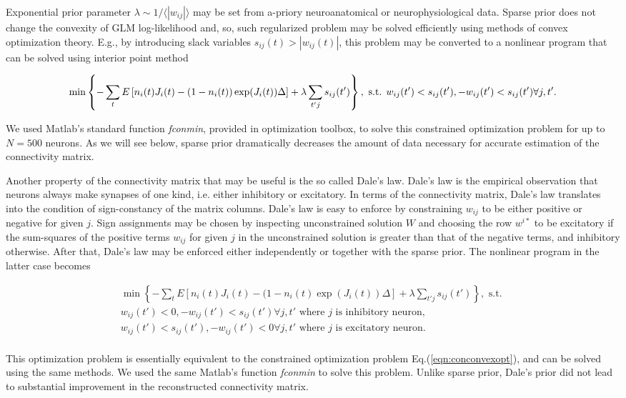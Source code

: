 Exponential prior parameter $\lambda\sim 1/\langle|w_{ij}|\rangle$ may be set from a-priory neuroanatomical or neurophysiological data. Sparse prior does not change the convexity of GLM log-likelihood and, so, such regularized problem may be solved efficiently using methods of convex optimization theory. E.g., by introducing slack variables $s_{ij}(t)>|w_{ij}(t)|$, this problem may be converted to a nonlinear program that can be solved using interior point method

\begin{equation} \label{eqn:conconvexopt}
\min \left\{-\sum\limits_t E\left[ n_i(t) J_i(t) - (1-n_i(t)) \exp(J_i(t)) \Delta \right]+\lambda \sum\limits_{t'j}s_{ij}(t')\right\}, \text{ s.t. } \\
w_{ij}(t')<s_{ij}(t'), -w_{ij}(t')<s_{ij}(t') \forall j, t'.
\end{equation}

We used Matlab's standard function {\em fconmin}, provided in optimization toolbox, to solve this constrained optimization problem for up to $N=500$ neurons. As we will see below, sparse prior dramatically decreases the amount of data necessary for accurate estimation of the connectivity matrix.

Another property of the connectivity matrix that may be useful is the so called Dale's law. Dale's law is the empirical observation that neurons always make synapses of one kind, i.e. either inhibitory or excitatory. In terms of the connectivity matrix, Dale's law translates into the condition of sign-constancy of the matrix columns. Dale's law is easy to enforce by constraining $w_{ij}$ to be either positive or negative for given $j$.  Sign assignments may be chosen by inspecting unconstrained solution $W$ and choosing the row $w^{i*}$ to be excitatory if the sum-squares of the positive terms $w_{ij}$ for given $j$ in the unconstrained solution is greater than that of the negative terms, and inhibitory otherwise.  After that, Dale's law may be enforced either independently or together with the sparse prior.  The nonlinear program in the latter case becomes

\begin{equation}
\begin{array}{l}
\min \left\{-\sum\limits_t E\left[ n_i(t) J_i(t) - (1-n_i(t) \exp(J_i(t)) \Delta \right]+\lambda \sum\limits_{t'j}s_{ij}(t')\right\}, \text{ s.t. }\\
w_{ij}(t')<0, -w_{ij}(t')<s_{ij}(t') \forall j, t'\text{ where }j\text{ is inhibitory neuron}, \\
w_{ij}(t')<s_{ij}(t'), -w_{ij}(t')<0 \forall j, t'\text{ where }j\text{ is excitatory neuron}. \\
\end{array}
\end{equation}

This optimization problem is essentially equivalent to the constrained optimization problem Eq.(\ref{eqn:conconvexopt}), and can be solved using the same methods. We used the same Matlab's function {\em fconmin} to solve this problem. Unlike sparse prior, Dale's prior did not lead to substantial improvement in the reconstructed connectivity matrix.
